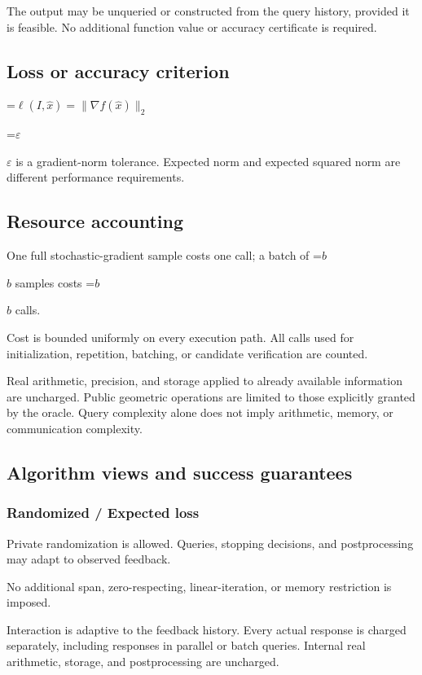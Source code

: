 \documentclass[10pt,a4paper]{article}
\newcommand{\AtlasMath}[1]{\par\begingroup\centering\setbox0=\hbox{$\displaystyle #1$}\ifdim\wd0>1.4\linewidth\typeout{ATLAS WIDE FORMULA: \the\wd0}\fi\ifdim\wd0>\linewidth\resizebox{\linewidth}{!}{\box0}\else\box0\fi\par\endgroup}
\newcommand{\AtlasInlineMath}[1]{\begingroup\setbox0=\hbox{$#1$}\ifdim\wd0>.4\linewidth\endgroup\AtlasMath{#1}\else\endgroup$#1$\fi}
\begin{document}
The output may be unqueried or constructed from the query history, provided it is feasible. No additional function value or accuracy certificate is required.

\subsection{Loss or accuracy criterion}

\AtlasMath{\ell(I,\widehat{x})=\|\nabla f(\widehat{x})\|_2}


\AtlasInlineMath{\varepsilon} is a gradient-norm tolerance. Expected norm and expected squared norm are different performance requirements.

\subsection{Resource accounting}
One full stochastic-gradient sample costs one call; a batch of \AtlasInlineMath{b} samples costs \AtlasInlineMath{b} calls.

Cost is bounded uniformly on every execution path. All calls used for initialization, repetition, batching, or candidate verification are counted.

Real arithmetic, precision, and storage applied to already available information are uncharged. Public geometric operations are limited to those explicitly granted by the oracle. Query complexity alone does not imply arithmetic, memory, or communication complexity.

\subsection{Algorithm views and success guarantees}
\subsubsection{Randomized / Expected loss}
Private randomization is allowed. Queries, stopping decisions, and postprocessing may adapt to observed feedback.

No additional span, zero-respecting, linear-iteration, or memory restriction is imposed.

Interaction is adaptive to the feedback history. Every actual response is charged separately, including responses in parallel or batch queries. Internal real arithmetic, storage, and postprocessing are uncharged.
\end{document}
